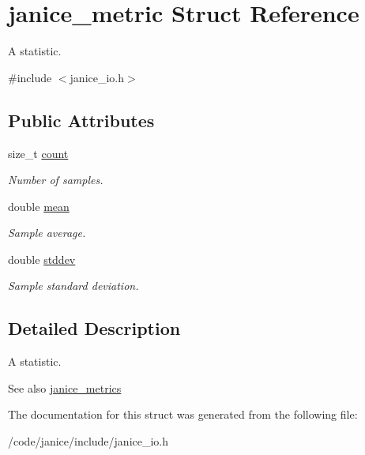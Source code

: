 \hypertarget{structjanice__metric}{}\section{janice\+\_\+metric Struct Reference}
\label{structjanice__metric}


A statistic.  




{\ttfamily \#include $<$janice\+\_\+io.\+h$>$}

\subsection*{Public Attributes}
\begin{DoxyCompactItemize}
\item 
\hypertarget{structjanice__metric_ada9bec341bc2cc7929cf21f765e35835}{}size\+\_\+t \hyperlink{structjanice__metric_ada9bec341bc2cc7929cf21f765e35835}{count}\label{structjanice__metric_ada9bec341bc2cc7929cf21f765e35835}

\begin{DoxyCompactList}\small\item\em Number of samples. \end{DoxyCompactList}\item 
\hypertarget{structjanice__metric_a7c3bd38c25afd86e7fbd311a0c0cfc87}{}double \hyperlink{structjanice__metric_a7c3bd38c25afd86e7fbd311a0c0cfc87}{mean}\label{structjanice__metric_a7c3bd38c25afd86e7fbd311a0c0cfc87}

\begin{DoxyCompactList}\small\item\em Sample average. \end{DoxyCompactList}\item 
\hypertarget{structjanice__metric_a2b0fe31542ba88ff01c87a931e77d9dd}{}double \hyperlink{structjanice__metric_a2b0fe31542ba88ff01c87a931e77d9dd}{stddev}\label{structjanice__metric_a2b0fe31542ba88ff01c87a931e77d9dd}

\begin{DoxyCompactList}\small\item\em Sample standard deviation. \end{DoxyCompactList}\end{DoxyCompactItemize}


\subsection{Detailed Description}
A statistic. 

\begin{DoxySeeAlso}{See also}
\hyperlink{structjanice__metrics}{janice\+\_\+metrics} 
\end{DoxySeeAlso}


The documentation for this struct was generated from the following file\+:\begin{DoxyCompactItemize}
\item 
/code/janice/include/janice\+\_\+io.\+h\end{DoxyCompactItemize}
